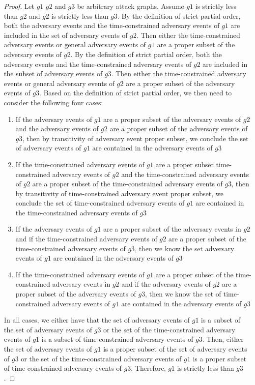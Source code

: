 \documentclass[runningheads]{llncs}
\theoremstyle{definition}
\newcommand{\squash}{\itemsep=0pt\parskip=0pt}
\begin{document}
\begin{proof}
    Let $g1$ $g2$ and $g3$ be arbitrary attack graphs. Assume $g1$ is strictly less than $g2$ and $g2$ is strictly less than $g3$. By the definition of strict partial order, both the adversary events and the time-constrained adversary events of $g1$ are included in the set of adversary events of $g2$. Then either the time-constrained adversary events or general adversary events of $g1$ are a proper subset of the adversary events of $g2$.  By the definition of strict partial order, both the adversary events and the time-constrained adversary events of $g2$ are included in the subset of adversary events of $g3$. Then either the time-constrained adversary events or general adversary events of $g2$ are a proper subset of the adversary events of $g3$. Based on the definition of strict partial order, we then need to consider the following four cases: 
    \begin{enumerate}
        \squash
        \item If the adversary events of $g1$ are a proper subset of the adversary events of $g2$ and the adversary events of $g2$ are a proper subset of the adversary events of $g3$, then by transitivity of adversary event proper subset, we conclude the set of adversary events of $g1$ are contained in the adversary events of $g3$ 
        \item If the time-constrained adversary events of $g1$ are a proper subset time-constrained adversary events of $g2$ and the time-constrained adversary events of $g2$ are a proper subset of the time-constrained adversary events of $g3$, then by transitivity of time-constrained adversary event proper subset, we conclude the set of time-constrained adversary events of $g1$ are contained in the time-constrained adversary events of $g3$  
        \item If the adversary events of $g1$ are a proper subset of the adversary events in $g2$ and if the time-constrained adversary events of $g2$ are a proper subset of the time-constrained adversary events of $g3$, then we know the set adversary events of $g1$ are contained in the adversary events of $g3$
        \item If the time-constrained adversary events of $g1$ are a proper subset of the time-constrained adversary events in $g2$ and if the adversary events of $g2$ are a proper subset of the adversary events of $g3$, then we know the set of time-constrained adversary events of $g1$ are contained in the adversary events of $g3$
    \end{enumerate}
   In all cases, we either have that the set of adversary events of $g1$ is a subset of the set of adversary events of $g3$ or the set of the time-constrained adversary events of $g1$ is a subset of time-constrained adversary events of $g3$. Then, either the set of adversary events of $g1$ is a proper subset of the set of adversary events of $g3$ or the set of the time-constrained adversary events of $g1$ is a proper subset of time-constrained adversary events of $g3$. Therefore, $g1$ is strictly less than $g3$. 
\end{proof}
\end{document}
